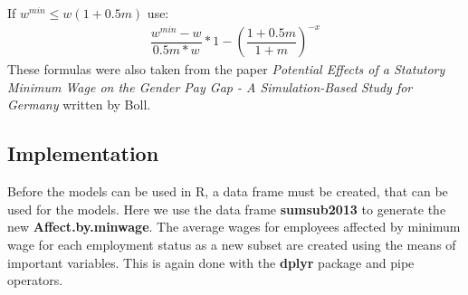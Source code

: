 \documentclass[a4paper]{article}
\begin{document}
If $w^{min} \leq w(1+0.5m)$ use:
\begin{align}
\label{monop2}
\dfrac{w^{min} - w}{0.5m * w}*1-\left(\dfrac{ 1+0.5m}{1+m}\right)^{-x}
\end{align}
These formulas were also taken from the paper \textit{Potential Effects of a Statutory Minimum Wage on the Gender Pay Gap - A Simulation-Based Study for Germany} written by Boll.
\subsection{Implementation}

Before the models can be used in R, a data frame must be created, that can be used for the models. Here we use the data frame \textbf{sumsub2013} to generate the new \textbf{Affect.by.minwage}.
The average wages for employees affected by minimum wage for each employment status as a new subset are created using the means of important variables. This is again done with the \textbf{dplyr} package and pipe operators.
\end{document}
